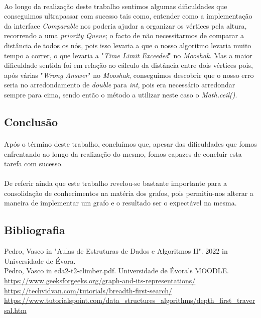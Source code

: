 \documentclass[12pt]{article}
\begin{document}
\paragraph{}
Ao longo da realização deste trabalho sentimos algumas dificuldades que conseguimos ultrapassar com sucesso tais como, entender como a implementação da interface \textit{Comparable} nos poderia ajudar a organizar os vértices pela altura, recorrendo a uma \textit{priority Queue}; o facto de não necessitarmos de comparar a distância de todos os nós, pois isso levaria a que o nosso algoritmo levaria muito tempo a correr, o que levaria a "\textit{Time Limit Exceeded}" no \textit{Mooshak}. Mas a maior dificuldade sentida foi em relação ao cálculo da distância entre dois vértices pois, após várias "\textit{Wrong Answer}" no \textit{Mooshak}, conseguimos descobrir que o nosso erro seria no arredondamento de \textit{double} para \textit{int}, pois era necessário arredondar sempre para cima, sendo então o método a utilizar neste caso o \textit{Math.ceil()}.
\newpage
\begin{center}
\section{Conclusão}
\end{center}
\paragraph{}
Após o término deste trabalho, concluímos que, apesar das dificuldades que fomos enfrentando ao longo da realização do mesmo, fomos capazes de concluir esta tarefa com sucesso.
\paragraph{}
De referir ainda que este trabalho revelou-se bastante importante para a consolidação de conhecimentos na matéria dos grafos, pois permitiu-nos alterar a maneira de implementar um grafo e o resultado ser o expectável na mesma.
\newpage
\begin{center}
\section{Bibliografia}
\end{center}
Pedro, Vasco in "Aulas de Estruturas de Dados e Algoritmos II". 2022 in Universidade de Évora.
\vspace{0.3cm} \\ Pedro, Vasco in eda2-t2-climber.pdf. Universidade de Évora's MOODLE.
\vspace{0.3cm} \\ \url{https://www.geeksforgeeks.org/graph-and-its-representations/} 
\vspace{0.3cm} \\ \url{https://techvidvan.com/tutorials/breadth-first-search/}
\vspace{0.3cm} \\ \url{https://www.tutorialspoint.com/data_structures_algorithms/depth_first_traversal.htm}
\end{document}
